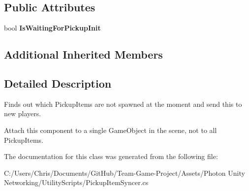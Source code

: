 \subsection*{Public Attributes}
\begin{DoxyCompactItemize}
\item 
bool {\bfseries Is\+Waiting\+For\+Pickup\+Init}\hypertarget{class_pickup_item_syncer_a825d5218c87edf22d2bd28c104017303}{}\label{class_pickup_item_syncer_a825d5218c87edf22d2bd28c104017303}

\end{DoxyCompactItemize}
\subsection*{Additional Inherited Members}


\subsection{Detailed Description}
Finds out which Pickup\+Items are not spawned at the moment and send this to new players. 

Attach this component to a single Game\+Object in the scene, not to all Pickup\+Items.

The documentation for this class was generated from the following file\+:\begin{DoxyCompactItemize}
\item 
C\+:/\+Users/\+Chris/\+Documents/\+Git\+Hub/\+Team-\/\+Game-\/\+Project/\+Assets/\+Photon Unity Networking/\+Utility\+Scripts/Pickup\+Item\+Syncer.\+cs\end{DoxyCompactItemize}
